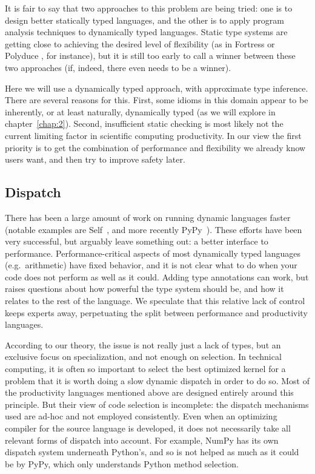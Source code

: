 It is fair to say that two approaches to this problem are being tried: one is
to design better statically typed languages, and the other is to apply
program analysis techniques to dynamically typed languages.
Static type systems are getting close to achieving the desired level
of flexibility (as in Fortress \cite{fortresspec} or Polyduce \cite{polyduce1},
for instance), but it is still too early to call a winner between these two
approaches (if, indeed, there even needs to be a winner).

Here we will use a dynamically typed approach, with approximate type inference.
There are several reasons for this.
First, some idioms in this domain appear to be inherently, or at least naturally,
dynamically typed (as we will explore in chapter~\ref{chap:2}).
Second, insufficient static checking is most likely not the current limiting
factor in scientific computing productivity.
In our view the first priority is to get the combination of
performance and flexibility we already know users want, and then try to
improve safety later.

\subsection{Dispatch}

There has been a large amount of work on running dynamic languages faster
(notable examples are Self~\cite{selflang}, and more recently PyPy~\cite{pypyjit}).
These efforts have been very successful, but arguably leave something
out: a better interface to performance.
Performance-critical aspects of most dynamically typed languages (e.g.\ arithmetic)
have fixed behavior, and it is not clear what to do when your code does not
perform as well as it could.
Adding type annotations can work, but raises questions about how powerful
the type system should be, and how it relates to the rest of the language.
We speculate that this relative lack of control keeps experts away,
perpetuating the split between performance and productivity languages.

According to our theory, the issue is not really just a lack of types,
but an exclusive focus on specialization, and not enough on selection.
In technical computing, it is often so important to select the best
optimized kernel for a problem that it is worth doing a slow dynamic
dispatch in order to do so.
Most of the productivity languages mentioned above are designed
entirely around this principle.
But their view of code selection is incomplete: the dispatch
mechanisms used are ad-hoc and not employed consistently.
Even when an optimizing compiler for the source language is developed,
it does not necessarily take all relevant forms of dispatch into
account.
For example, NumPy has its own dispatch system underneath Python's,
and so is not helped as much as it could be by PyPy, which only
understands Python method selection.

